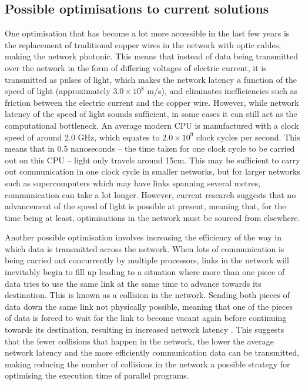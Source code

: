 \documentclass[a4paper, 12pt]{article}
\begin{document}
\subsection{Possible optimisations to current solutions}
\label{sec:possible_optimisations}

One optimisation that has become a lot more accessible in the last few years is the replacement of traditional copper wires in the network with optic cables, making the network photonic. This means that instead of data being transmitted over the network in the form of differing voltages of electric current, it is transmitted as pulses of light, which makes the network latency a function of the speed of light (approximately $3.0 \times 10^8 $ m/s), and eliminates inefficiencies such as friction between the electric current and the copper wire. However, while network latency of the speed of light sounds sufficient, in some cases it can still act as the computational bottleneck. An average modern CPU is manufactured with a clock speed of around 2.0 GHz, which equates to $2.0 \times 10^9$ clock cycles per second. This means that in 0.5 nanoseconds -- the time taken for one clock cycle to be carried out on this CPU -- light only travels around 15cm. This may be sufficient to carry out communication in one clock cycle in smaller networks, but for larger networks such as supercomputers which may have links spanning several metres, communication can take a lot longer. However, current research suggests that no advancement of the speed of light is possible at present, meaning that, for the time being at least, optimisations in the network must be sourced from elsewhere. 

Another possible optimisation involves increasing the efficiency of the way in which data is transmitted across the network. When lots of communication is being carried out concurrently by multiple processors, links in the network will inevitably begin to fill up leading to a situation where more than one piece of data tries to use the same link at the same time to advance towards its destination. This is known as a collision in the network. Sending both pieces of data down the same link not physically possible, meaning that one of the pieces of data is forced to wait for the link to become vacant again before continuing towards its destination, resulting in increased network latency \cite{Lam04}. This suggests that the fewer collisions that happen in the network, the lower the average network latency and the more efficiently communication data can be transmitted, making reducing the number of collisions in the network a possible strategy for optimising the execution time of parallel programs.
\end{document}
